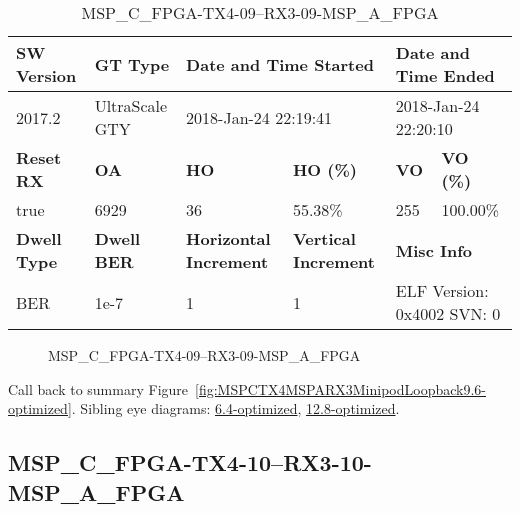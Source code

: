 \begin{table}[h]
\centering
\caption{MSP\_C\_FPGA-TX4-09--RX3-09-MSP\_A\_FPGA}
\label{tab:MSPCFPGATX409RX309MSPAFPGA9.6-optimized}
\begin{tabular}{@{}|l|l|l|l|l|l|@{}}
\toprule
\textbf{SW Version}                & \textbf{GT Type}   & \multicolumn{2}{l|}{\textbf{Date and Time Started}}            & \multicolumn{2}{l|}{\textbf{Date and Time Ended}}        \\ \midrule
2017.2                       & UltraScale GTY          & \multicolumn{2}{l|}{2018-Jan-24 22:19:41}                   & \multicolumn{2}{l|}{2018-Jan-24 22:20:10}               \\ \midrule
\textbf{Reset RX}                  & \textbf{OA} & \textbf{HO}   & \textbf{HO (\%)} & \textbf{VO} & \textbf{VO (\%)} \\ \midrule
true & 6929        & 36          & 55.38\%        & 255        & 100.00\%       \\ \midrule
\textbf{Dwell Type}                & \textbf{Dwell BER} & \textbf{Horizontal Increment} & \textbf{Vertical Increment}    & \multicolumn{2}{l|}{\textbf{Misc Info}}                  \\ \midrule
BER                            & 1e-7        & 1        & 1           & \multicolumn{2}{l|}{ELF Version: 0x4002 SVN: 0}                         \\ \bottomrule
\end{tabular}
\end{table}

\begin{figure}[h]
\caption{MSP\_C\_FPGA-TX4-09--RX3-09-MSP\_A\_FPGA} \label{fig:MSPCFPGATX409RX309MSPAFPGA9.6-optimized}
\end{figure}

Call back to summary Figure~\ref{fig:MSPCTX4MSPARX3MinipodLoopback9.6-optimized}.
Sibling eye diagrams: \hyperref[sec:MSPCFPGATX409RX309MSPAFPGA6.4-optimized]{6.4-optimized}, \hyperref[sec:MSPCFPGATX409RX309MSPAFPGA12.8-optimized]{12.8-optimized}.

\clearpage
\newpage


\subsection{MSP\_C\_FPGA-TX4-10--RX3-10-MSP\_A\_FPGA}\label{sec:MSPCFPGATX410RX310MSPAFPGA9.6-optimized}


